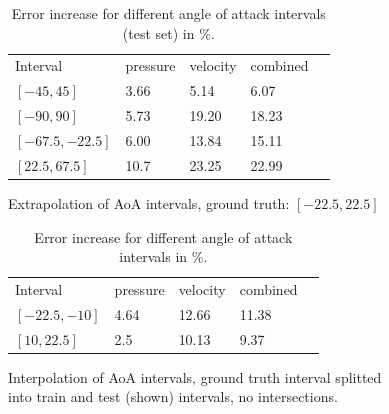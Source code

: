 \documentclass[acmtog]{techreportacmart}
\begin{document}
\begin{table}
	\caption{Error increase for different angle of attack intervals (test set) in \%.}
\label{tab:gen1}
\begin{center}
\begin{tabular}{l|l|l|l|l}
  \toprule
  Interval   		& pressure   &	velocity    & combined \\
  $[-45, 45]$	 	& 3.66	  & 5.14		& 6.07	   \\
  $[-90, 90]$	 	& 5.73	  & 19.20		& 18.23	   \\
  $[-67.5, -22.5]$ 	& 6.00	  & 13.84		& 15.11	   \\
  $[22.5, 67.5]$  	& 10.7	  & 23.25		& 22.99	   \\
  \bottomrule
\end{tabular}
\end{center}
\bigskip\centering
	\footnotesize Extrapolation of AoA intervals, ground truth: $[-22.5, 22.5]$ \\
\end{table}%

\begin{table}
\caption{Error increase for different angle of attack intervals in \%.}
\label{tab:gen2}
\begin{center}
\begin{tabular}{l|l|l|l|l}
  \toprule
  Interval   	& pressure   &	velocity    & combined \\
  $[-22.5, -10]$ 	& 4.64	  & 12.66		& 11.38	   \\
  $[10, 22.5]$	 	& 2.5	  & 10.13		& 9.37	   \\
  \bottomrule
\end{tabular}
\end{center}
\bigskip\centering
\footnotesize Interpolation of AoA intervals, ground truth interval splitted \\
	into train and test (shown) intervals, no intersections.  
\end{table}%
\end{document}
